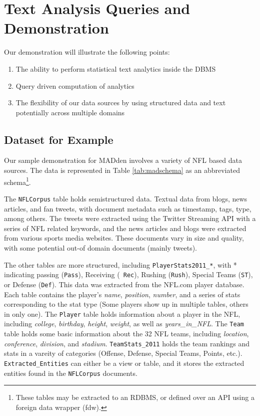 \section{Text Analysis Queries and Demonstration}
Our demonstration will illustrate the following points: 
\begin{enumerate}[noitemsep]
  \item The ability to perform statistical text analytics inside the DBMS
  \item Query driven computation of analytics
  \item The flexibility of our data sources by using structured data and text
  potentially across multiple domains
\end{enumerate} 
\subsection{Dataset for Example}
Our sample demonstration for MADden involves a variety of NFL based data sources. 
The data is represented in Table \ref{tab:madschema} as an abbreviated
schema\footnote{These tables may be extracted to an RDBMS, or defined over an
API using a foreign data wrapper (fdw).}.

The {\tt NFLCorpus} table holds semistructured data. Textual data from blogs,
news articles, and fan tweets, with document metadata such as timestamp, tags,
type, among others. The tweets were extracted using the Twitter Streaming API
with a series of NFL related keywords, and the news articles and blogs were
extracted from various sports media websites. These documents vary in size and
quality, with some potential out-of domain documents (mainly tweets).

The other tables are more structured,
including {\tt PlayerStats2011\_*}, with * indicating passing ({\tt Pass}), Receiving ({\tt
Rec}), Rushing ({\tt Rush}), Special Teams ({\tt ST}), or Defense ({\tt Def}).
This data was extracted from the NFL.com player database. Each table contains
the player's \textit{name}, \textit{position}, \textit{number}, and a series of
stats corresponding to the stat type (Some players show up in multiple tables, others in only one). The
{\tt Player} table holds information about a player in the NFL, including
\textit{college}, \textit{birthday}, \textit{height}, \textit{weight}, as well
as \textit{years\_in\_NFL}. The {\tt Team} table holds some basic information
about the 32 NFL teams, including \textit{location}, \textit{conference}, \textit{division}, and \textit{stadium}.
{\tt TeamStats\_2011} holds the team rankings and stats in a vareity of categories (Offense, Defense, Special Teams,
Points, etc.).
{\tt Extracted\_Entities} can either be a view or table, and it stores the
extracted entities found in the {\tt NFLCorpus} documents.

